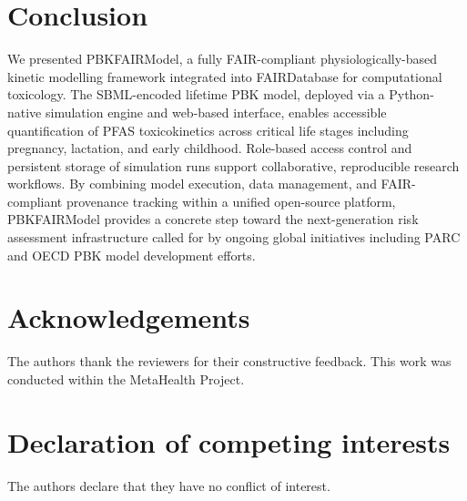 \documentclass[preprint,12pt]{elsarticle}
\begin{document}
\begin{linenumbers}
\section{Conclusion}\label{sec5}


We presented PBKFAIRModel, a fully FAIR-compliant physiologically-based
kinetic modelling framework integrated into FAIRDatabase for
computational toxicology. The SBML-encoded lifetime PBK model, deployed
via a Python-native simulation engine and web-based interface, enables
accessible quantification of PFAS toxicokinetics across critical
life stages including pregnancy, lactation, and early childhood.
Role-based access control and persistent storage of simulation runs
support collaborative, reproducible research workflows. By combining
model execution, data management, and FAIR-compliant provenance
tracking within a unified open-source platform, PBKFAIRModel provides
a concrete step toward the next-generation risk assessment infrastructure
called for by ongoing global initiatives including PARC and OECD
PBK model development efforts.

\section*{Acknowledgements}
The authors thank the reviewers for their constructive feedback. This
work was conducted within the MetaHealth Project.


\section*{Declaration of competing interests}
The authors declare that they have no conflict of interest.


\end{linenumbers}
\end{document}

